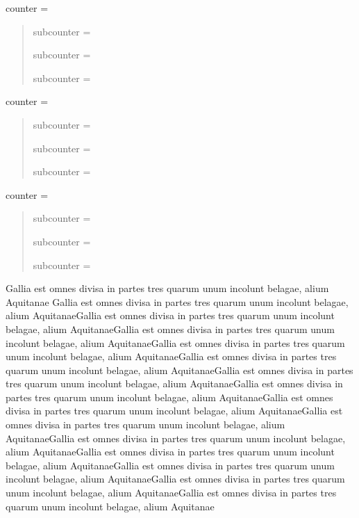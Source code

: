 counter = \YOcounter
\begin{quote}
    subcounter = \YOsubcounter  \label{MyLabel1}

    subcounter = \YOsubcounter

    subcounter = \YOsubcounter

\end{quote}
counter = \YOcounter
\begin{quote}
    subcounter = \YOsubcounter

    subcounter = \YOsubcounter

    subcounter = \YOsubcounter   \label{MyLabel2}

\end{quote}

counter = \YOcounter  %
\begin{quote}
    subcounter = \YOsubcounter

    subcounter = \YOsubcounter

    subcounter = \YOsubcounter

\end{quote}



Gallia est omnes divisa in partes tres quarum unum incolunt belagae, alium Aquitanae Gallia est omnes divisa in partes tres quarum unum incolunt belagae, alium AquitanaeGallia est omnes divisa in partes tres quarum unum incolunt belagae, alium AquitanaeGallia est omnes divisa in partes tres quarum unum incolunt belagae, alium AquitanaeGallia est omnes divisa in partes tres quarum unum incolunt belagae, alium AquitanaeGallia est omnes divisa in partes tres quarum unum incolunt belagae, alium AquitanaeGallia est omnes divisa in partes tres quarum unum incolunt belagae, alium AquitanaeGallia est omnes divisa in partes tres quarum unum incolunt belagae, alium AquitanaeGallia est omnes divisa in partes tres quarum unum incolunt belagae, alium AquitanaeGallia est omnes divisa in partes tres quarum unum incolunt belagae, alium AquitanaeGallia est omnes divisa in partes tres quarum unum incolunt belagae, alium AquitanaeGallia est omnes divisa in partes tres quarum unum incolunt belagae, alium AquitanaeGallia est omnes divisa in partes tres quarum unum incolunt belagae, alium AquitanaeGallia est omnes divisa in partes tres quarum unum incolunt belagae, alium AquitanaeGallia est omnes divisa in partes tres quarum unum incolunt belagae, alium Aquitanae


